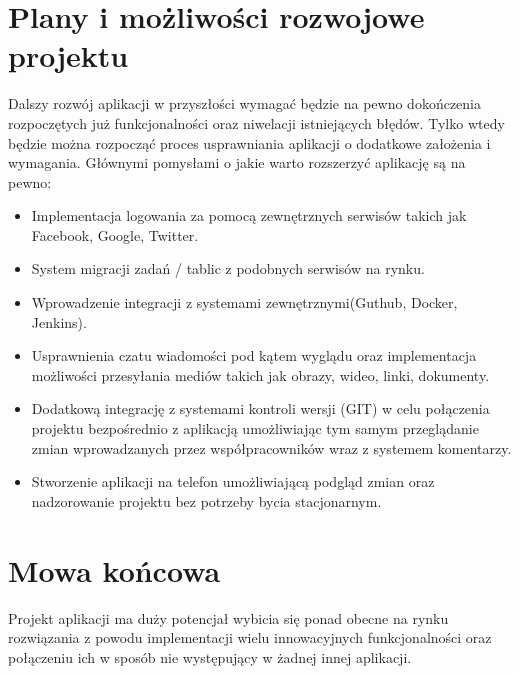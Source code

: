 \documentclass[eng,printmode]{mgr}
\begin{document}
\section{Plany i możliwości rozwojowe projektu}
Dalszy rozwój aplikacji w przyszłości wymagać będzie na pewno dokończenia rozpoczętych już funkcjonalności oraz niwelacji istniejących błędów. Tylko wtedy będzie można rozpocząć proces usprawniania aplikacji o dodatkowe założenia i wymagania. Głównymi pomysłami o jakie warto rozszerzyć aplikację są na pewno:
\begin{itemize}
  \item Implementacja logowania za pomocą zewnętrznych serwisów takich jak Facebook, Google, Twitter.
  \item System migracji zadań / tablic z podobnych serwisów na rynku.
  \item Wprowadzenie integracji z systemami zewnętrznymi(Guthub, Docker, Jenkins).
  \item Usprawnienia czatu wiadomości pod kątem wyglądu oraz implementacja możliwości przesyłania mediów takich jak obrazy, wideo, linki, dokumenty.
  \item Dodatkową integrację z systemami kontroli wersji (GIT) w celu połączenia projektu bezpośrednio z aplikacją umożliwiając tym samym przeglądanie zmian wprowadzanych przez współpracowników wraz z systemem komentarzy.
  \item Stworzenie aplikacji na telefon umożliwiającą podgląd zmian oraz nadzorowanie projektu bez potrzeby bycia stacjonarnym.
\end{itemize}
\section{Mowa końcowa}
Projekt aplikacji ma duży potencjał wybicia się ponad obecne na rynku rozwiązania z powodu implementacji wielu innowacyjnych funkcjonalności oraz połączeniu ich w sposób nie występujący w żadnej innej aplikacji.

\begingroup
\raggedright

\endgroup
\end{document}
